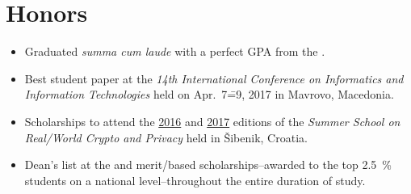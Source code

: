 \documentclass[10pt,letterpaper]{article}%
\begin{document}
\begin{minipage}[t]{.4\textwidth}
  \section{Honors}%
  \label{sec:honors}
  \begin{itemize}[leftmargin=*]
  \item Graduated \emph{summa cum laude} with a perfect GPA from the
    .
  \item Best student paper at the \emph{14th International Conference on
      Informatics and Information Technologies} held on Apr.\ 7\==9, 2017 in
    Mavrovo, Macedonia.
  \item Scholarships to attend the
    \href{http://summerschool-croatia.cs.ru.nl/2016/}{2016} and
    \href{http://summerschool-croatia.cs.ru.nl/2017/}{2017} editions of the
    \emph{Summer School on Real\-/World Crypto and Privacy} held in Šibenik,
    Croatia.
  \item Dean’s list at the  and merit\-/based scholarships\---awarded to the top
    \SI{2.5}{\percent} students on a national level\---throughout the entire
    duration of study.
  \end{itemize}
\end{minipage}
\end{document}

